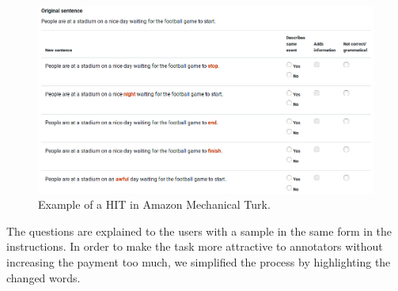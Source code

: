 \begin{figure}[tph!]
\centering
	\includegraphics[totalheight=7cm]{fig/sample_hit.png}
	\caption{Example of a \ac{HIT} in Amazon Mechanical Turk.}
	\label{fig:example_hit}
\end{figure}
The questions are explained to the users with a sample in the same form in the instructions. In order to make the task more attractive to annotators without increasing the payment too much, we simplified the process by highlighting the changed words.
\newline


